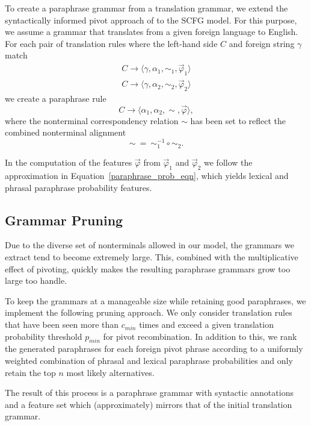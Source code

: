 \documentclass[11pt]{article}
\begin{document}
To create a paraphrase grammar from a translation grammar, we extend
the syntactically informed pivot approach of
 to the SCFG model. For this purpose, we
assume a grammar that translates from a given foreign language to
English. For each pair of translation rules where the left-hand side
$C$ and foreign string $\gamma$ match
\begin{eqnarray*}
C \rightarrow \langle \gamma, \alpha_1, \sim_1, \vec{\varphi}_1 \rangle \\
C \rightarrow \langle \gamma, \alpha_2, \sim_2, \vec{\varphi}_2 \rangle
\end{eqnarray*}
we create a paraphrase rule
\begin{equation*}
C \rightarrow \langle \alpha_1, \alpha_2, \sim, \vec{\varphi} \rangle ,
\end{equation*}
where the nonterminal correspondency relation $\sim$ has been set to
reflect the combined nonterminal alignment
\begin{equation*}
\sim ~ = ~ \sim_1^{-1} \circ \sim_2 .
\end{equation*}

In the computation of the features $\vec{\varphi}$ from
$\vec{\varphi}_1$ and $\vec{\varphi}_2$ we follow the approximation in
Equation~\ref{paraphrase_prob_eqn}, which yields lexical and phrasal
paraphrase probability features.

\subsection{Grammar Pruning}
\label{pruning}

Due to the diverse set of nonterminals allowed in our model, the
grammars we extract tend to become extremely large. This, combined
with the multiplicative effect of pivoting, quickly makes the
resulting paraphrase grammars grow too large too handle.

To keep the grammars at a manageable size while retaining good
paraphrases, we implement the following pruning approach. We only
consider translation rules that have been seen more than
$c_{\mathit{min}}$ times and exceed a given translation probability
threshold $p_{\mathit{min}}$ for pivot recombination. In addition to
this, we rank the generated paraphrases for each foreign pivot phrase
according to a uniformly weighted combination of phrasal and lexical
paraphrase probabilities and only retain the top $n$ most likely
alternatives.

The result of this process is a paraphrase grammar with syntactic
annotations and a feature set which (approximately) mirrors that of
the initial translation grammar.
\end{document}
